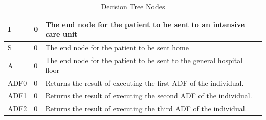 \begin{table}[H]
{\begin{tabular}{|l|l|l|}
I               & 0              & The end node for the patient to be sent to an intensive care unit                                                                                                                                                                                                                                                                                                                              \\ \hline
S               & 0              & The end node for the patient to be sent home                                                                                                                                                                                                                                                                                                                                                   \\ \hline
A               & 0              & The end node for the patient to be sent to the general hospital floor                                                                                                                                                                                                                                                                                                                          \\ \hline
ADF0            & 0              & Returns the result of executing the first ADF of the individual.                                                                                                                                                                                                                                                                                                                               \\ \hline
ADF1            & 0              & Returns the result of executing the second ADF of the individual.                                                                                                                                                                                                                                                                                                                              \\ \hline
ADF2            & 0              & Returns the result of executing the third ADF of the individual.                                                                                                                                                                                                                                                                                                                               \\ \hline
\end{tabular}}
\caption{Decision Tree Nodes}
\label{tab:nodes}
\end{table}

